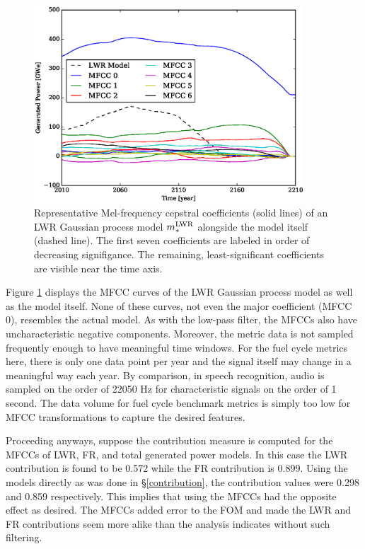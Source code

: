 \begin{figure}[htb]
\centering
\includegraphics[width=0.9\textwidth]{mfcc-lwr-model.eps}
\caption{Representative Mel-frequency cepstral coefficients (solid lines) of 
an LWR Gaussian process model $m_*^{\mathrm{LWR}}$ alongside the model itself (dashed 
line). The first seven coefficients are labeled in order of decreasing 
signifigance.  The remaining, least-significant coefficients are visible
near the time axis.}
\label{mfcc-lwr-model}
\end{figure}

Figure \ref{mfcc-lwr-model} displays the MFCC curves of the LWR Gaussian 
process model as well as the model itself. None of these curves, not even the 
major coefficient (MFCC 0), resembles the actual model.
As with the low-pass filter, the MFCCs also have 
uncharacteristic negative components.  Moreover, 
the metric data is not sampled frequently enough to have meaningful
time windows. For the fuel cycle metrics here, there is only one data point per year 
and the signal itself may change in a meaningful way each year. By comparison, 
in speech recognition, audio is sampled on the order of 22050 Hz 
\cite{EBUTECH3285,juang1991hidden} for characteristic 
signals on the order of 1 second.  The data volume for fuel cycle benchmark metrics
is simply too low for MFCC transformations to capture the desired features. 

Proceeding anyways, suppose the contribution measure is computed for the MFCCs 
of LWR, FR, and 
total generated power models.  In this case the LWR contribution is found to be 
0.572 while the FR contribution is 0.899. Using the models directly as was done 
in \S\ref{contribution}, the contribution values were 0.298 and 0.859 respectively.
This implies that using the MFCCs had the opposite effect as desired.  The MFCCs
added error to the FOM and made the LWR and FR contributions seem more alike 
than the analysis indicates without such filtering.

